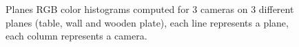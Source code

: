 \begin{figure}
\begin{minipage}[t][6cm]{0.33\linewidth}
    \end{minipage}
    \vspace{4em}
    \caption{Planes RGB color histograms computed for 3 cameras on 3 different planes (table, wall and wooden plate), each line represents a plane, each column represents a camera. }\label{color_hist}
\end{figure}

